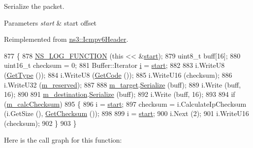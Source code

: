 Serialize the packet. 


\begin{DoxyParams}{Parameters}
{\em start} & start offset \\
\hline
\end{DoxyParams}


Reimplemented from \hyperlink{classns3_1_1Icmpv6Header_a730861c09bbcc03f586a7b31656cbbc5}{ns3\+::\+Icmpv6\+Header}.


\begin{DoxyCode}
877 \{
878   \hyperlink{log-macros-disabled_8h_a90b90d5bad1f39cb1b64923ea94c0761}{NS\_LOG\_FUNCTION} (\textcolor{keyword}{this} << &\hyperlink{namespacevisualizer_1_1core_a2a35e5d8a34af358b508dac8635754e0}{start});
879   uint8\_t buff[16];
880   uint16\_t checksum = 0;
881   Buffer::Iterator \hyperlink{bernuolliDistribution_8m_a6f6ccfcf58b31cb6412107d9d5281426}{i} = \hyperlink{namespacevisualizer_1_1core_a2a35e5d8a34af358b508dac8635754e0}{start};
882 
883   i.WriteU8 (\hyperlink{classns3_1_1Icmpv6Header_a739eb76b792c840e9729110cb9d3ba1d}{GetType} ());
884   i.WriteU8 (\hyperlink{classns3_1_1Icmpv6Header_a0a66ddd5032075acb43d43677c343496}{GetCode} ());
885   i.WriteU16 (checksum);
886   i.WriteU32 (\hyperlink{classns3_1_1Icmpv6Redirection_af36c40a4afb2797bb42114eb4d873ee3}{m\_reserved});
887 
888   \hyperlink{classns3_1_1Icmpv6Redirection_a02922d245b49632f1705dff98390d8bc}{m\_target}.\hyperlink{classns3_1_1Ipv6Address_adf5b453892de2893a371380ab299db88}{Serialize} (buff);
889   i.Write (buff, 16);
890 
891   \hyperlink{classns3_1_1Icmpv6Redirection_a0df467540aa03eb82b76daa1905b5d7e}{m\_destination}.\hyperlink{classns3_1_1Ipv6Address_adf5b453892de2893a371380ab299db88}{Serialize} (buff);
892   i.Write (buff, 16);
893 
894   \textcolor{keywordflow}{if} (\hyperlink{classns3_1_1Icmpv6Header_afdfd2dc6e28e0504e02c741d9585ccf9}{m\_calcChecksum})
895     \{
896       i = \hyperlink{namespacevisualizer_1_1core_a2a35e5d8a34af358b508dac8635754e0}{start};
897       checksum = i.CalculateIpChecksum (i.GetSize (), \hyperlink{classns3_1_1Icmpv6Header_a94c5bd0503cfd705ff2c93eb57fd1a75}{GetChecksum} ());
898 
899       i = \hyperlink{namespacevisualizer_1_1core_a2a35e5d8a34af358b508dac8635754e0}{start};
900       i.Next (2);
901       i.WriteU16 (checksum);
902     \}
903 \}
\end{DoxyCode}


Here is the call graph for this function\+:


